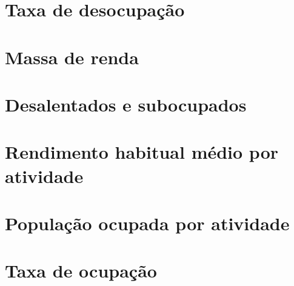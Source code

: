 \documentclass{SelfArx}
\begin{document}
\section*{Taxa de desocupação}
\label{sec:org961f8d9}


\section*{Massa de renda}
\label{sec:org3941885}


\section*{Desalentados e subocupados}
\label{sec:org054ff75}

\section*{Rendimento habitual médio por atividade}
\label{sec:org67d3229}

\section*{População ocupada por atividade}
\label{sec:orgb092cac}



\section*{Taxa de ocupação}
\label{sec:orgd29a7da}
\end{document}
